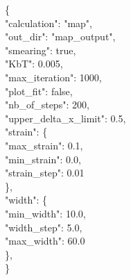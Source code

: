 \documentclass[a4paper,12pt]{article}
\begin{document}
\begin{tabbing}
\{\= \\
	 \> "calculation": "map", \\
	 \>"out\_dir": "map\_output", \\
          \>"smearing": true, \\
           \>"KbT": 0.005, \\
           \>"max\_iteration": 1000, \\
           \>"plot\_fit": false, \\
          \>"nb\_of\_steps": 200, \\
	 \> "upper\_delta\_x\_limit": 0.5, \\
         \> "strain": \{ \= \\
                    \>\>"max\_strain": 0.1, \\
                    \>\>"min\_strain": 0.0, \\
                    \>\>"strain\_step": 0.01\\
         \> \}, \\
          \>"width": \{ \= \\
                    \>\>"min\_width": 10.0,\\ 
                    \>\>"width\_step": 5.0, \\
                    \>\>"max\_width": 60.0\\
          \>\}, \\

\}\\
\end{tabbing}
\end{document}
